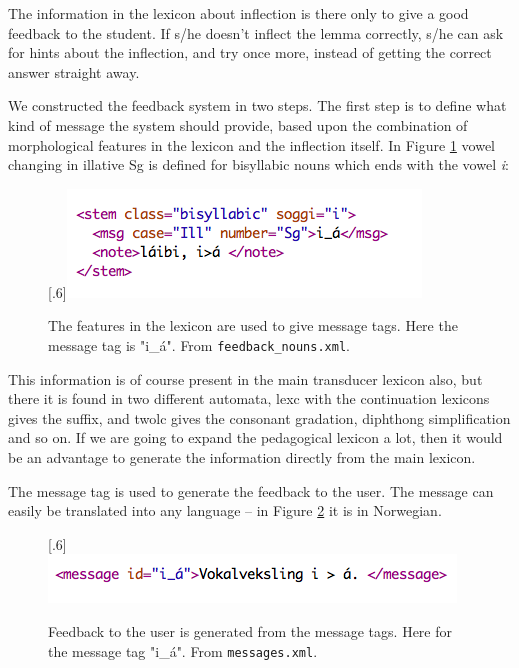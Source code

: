 \documentclass[a4paper,12pt]{article}
\begin{document}
The information in the lexicon about inflection is there only to give a good feedback to the student. If s/he doesn't inflect the lemma correctly, s/he can ask for hints about the inflection, and try once more, instead of getting the correct answer straight away. 

We constructed the feedback system in two steps. The first step is to define what kind of message the system should provide, based upon the combination of morphological features in the lexicon and the inflection itself. In Figure \ref{feedbacknouns} vowel changing in illative Sg is defined for bisyllabic nouns which ends with the vowel \textit{i}:


\begin{figure}[htbp]
\begin{center}
\scalebox{.6}[.6]{\includegraphics{img/feedback_nouns.png}}\\
\caption{The features in the lexicon are used to give message tags. Here the message tag is "i\_á". From \texttt{feedback\_nouns.xml}.}
\label{feedbacknouns}
\end{center}
\end{figure}

This information is of course present in the main transducer lexicon also, but there it is found in two different automata, lexc with the continuation lexicons gives the suffix, and twolc gives the consonant gradation, diphthong simplification and so on. If we are going to expand the pedagogical lexicon a lot, then it would be an advantage to generate the information directly from the main lexicon. 

The message tag is used to generate the feedback to the user. The message can easily be translated into any language -- in Figure \ref{mess} it is in Norwegian.

\begin{figure}[htbp]
\begin{center}
\scalebox{.6}[.6]{\includegraphics{img/messages.png}}\\
\caption{Feedback to the user is generated from the message tags. Here for the message tag "i\_á". From \texttt{messages.xml}.}
\label{mess}
\end{center}
\end{figure}
\end{document}
